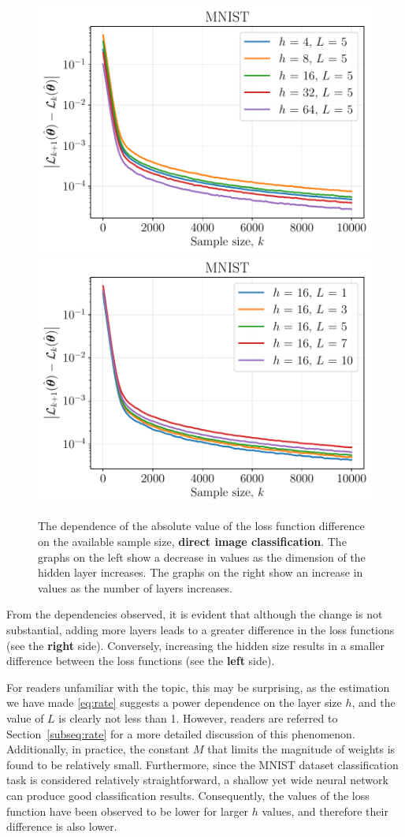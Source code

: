 \documentclass{article}
\begin{document}
\begin{figure}[ht]
    \centering
    \includegraphics[width=0.5\linewidth]{figs/mnist_hidden_size.pdf}\hfill
    \includegraphics[width=0.5\linewidth]{figs/mnist_num_layers.pdf}
    \caption{The dependence of the absolute value of the loss function difference on the available sample size, \textbf{direct image classification}. The graphs on the left show a decrease in values as the dimension of the hidden layer increases. The graphs on the right show an increase in values as the number of layers increases.}
    \label{fig:mnist}
\end{figure}

From the dependencies observed, it is evident that although the change is not substantial, adding more layers leads to a greater difference in the loss functions (see the \textbf{right} side). Conversely, increasing the hidden size results in a smaller difference between the loss functions (see the \textbf{left} side). 

For readers unfamiliar with the topic, this may be surprising, as the estimation we have made \eqref{eq:rate} suggests a power dependence on the layer size $h$, and the value of $L$ is clearly not less than 1. However, readers are referred to Section~\ref{subseq:rate} for a more detailed discussion of this phenomenon. Additionally, in practice, the constant $M$ that limits the magnitude of weights is found to be relatively small. Furthermore, since the MNIST dataset classification task is considered relatively straightforward, a shallow yet wide neural network can produce good classification results. Consequently, the values of the loss function have been observed to be lower for larger $h$ values, and therefore their difference is also lower.
\end{document}
